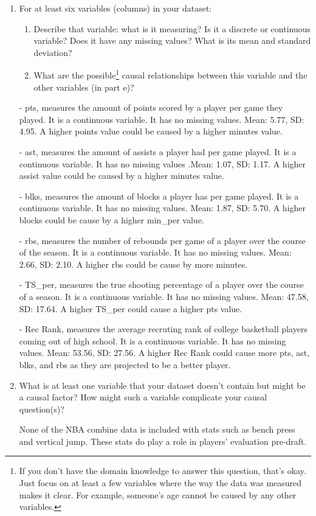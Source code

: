 \documentclass[12pt]{article}
\begin{document}
\begin{enumerate}[itemsep=0em,label={(\alph*)}]
\item For at least six variables (columns) in your dataset:
  \begin{enumerate}[itemsep=0em,label={\roman*.}]
     \item Describe that variable: what is it measuring? Is it a discrete or continuous variable? Does it have any missing values? What is its mean and standard deviation?
     \item What are the possible\footnote{If you don't have the domain knowledge to answer this question, that's okay. Just focus on at least a few variables where the way the data was measured makes it clear. For example, someone's age cannot be caused by any other variables.} causal relationships between this variable and the other variables (in part e)?
  \end{enumerate}
  
  - pts, measures the amount of points scored by a player per game they played. It is a continuous variable. It has no missing values. Mean: 5.77, SD: 4.95. A higher points value could be caused by a higher minutes value.
  
  - ast, measures the amount of assists a player had per game played. It is a continuous variable. It has no missing values .Mean: 1.07, SD: 1.17. A higher assist value could be caused by a higher minutes value.
  
  - blks, measures the amount of blocks a player has per game played. It is a continuous variable. It has no missing values. Mean: 1.87, SD: 5.70. A higher blocks could be cause by a higher min\_per value.
  
  - rbs, measures the number of rebounds per game of a player over the course of the season. It is a continuous variable. It has no missing values. Mean: 2.66, SD: 2.10. A higher rbs could be cause by more minutes.
  
  - TS\_per, measures the true shooting percentage of a player over the course of a season. It is a continuous variable. It has no missing values. Mean: 47.58, SD: 17.64. A higher TS\_per could cause a higher pts value.
  
  - Rec Rank, measures the average recruting rank of college basketball players coming out of high school. It is a continuous variable. It has no missing values. Mean: 53.56, SD: 27.56. A higher Rec Rank could cause more pts, ast, blks, and rbs as they are projected to be a better player.
  
\item What is at least one variable that your dataset doesn't contain but might be a causal factor? How might such a variable complicate your causal question(s)?

None of the NBA combine data is included with stats such as bench press and vertical jump. These stats do play a role in players' evaluation pre-draft. 

\end{enumerate}
\end{document}

